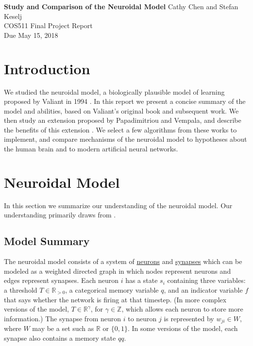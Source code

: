 \documentclass[letterpaper, 12pt]{article}
\begin{document}
\noindent
\textbf{Study and Comparison of the Neuroidal Model} \hfill \newline Cathy Chen and Stefan Keselj \\
COS511 Final Project Report \\
Due May 15, 2018

\section*{Introduction}
We studied the neuroidal model, a biologically plausible model of learning proposed by Valiant in 1994 \cite{valiant_circuits_1994}. In this report we present a concise summary of the model and abilities, based on Valiant's original book and subsequent work. We then study an extension proposed by Papadimitriou and Vempala, and describe the benefits of this extension \cite{papadimitriou_cortical_2015}. We select a few algorithms from these works to implement, and compare mechanisms of the neuroidal model to hypotheses about the human brain and to modern artificial neural networks.

\section{Neuroidal Model}
In this section we summarize our understanding of the neuroidal model. Our understanding primarily draws from \cite{valiant_circuits_1994, valiant_memorization_2005, papadimitriou_cortical_2015}.

\subsection{Model Summary}
The neuroidal model consists of a system of \underline{neurons} and \underline{synapses} which can be modeled as a weighted directed graph in which nodes represent neurons and edges represent synapses. Each neuron $i$ has a state $s_i$ containing three variables: a threshold $T\in\mathbb{R}_{>0}$, a categorical memory variable $q$, and an indicator variable $f$ that says whether the network is firing at that timestep. (In more complex versions of the model, $T\in\mathbb{R}^\gamma$, for $\gamma\in\mathbb{Z}$, which allows each neuron to store more information.) The synapse from neuron $i$ to neuron $j$ is represented by $w_{ji}\in W$, where $W$ may be a set such as $\mathbb{R}$ or $\{0,1\}$. In some versions of the model, each synapse also contains a memory state $qq$.
\end{document}
